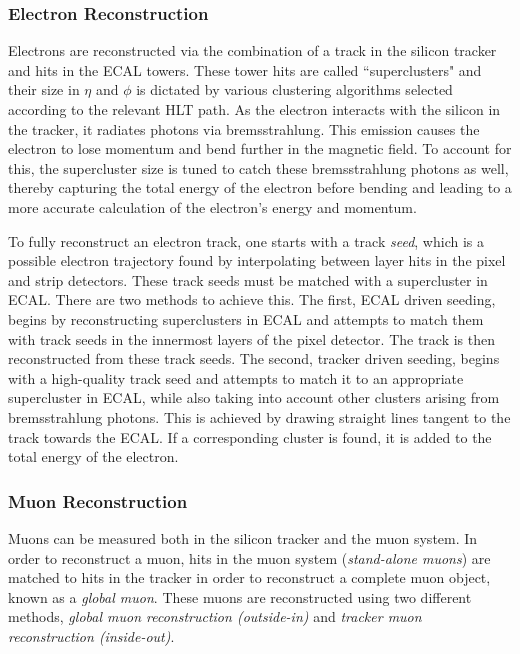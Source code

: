 \subsubsection{Electron Reconstruction}

Electrons are reconstructed via the combination of a track in the silicon tracker and hits in the ECAL towers. These tower hits are called ``superclusters" and their size in $\eta$ and $\phi$ is dictated by various clustering algorithms selected according to the relevant HLT path. As the electron interacts with the silicon in the tracker, it radiates photons via bremsstrahlung. This emission causes the electron to lose momentum and bend further in the magnetic field. To account for this, the supercluster size is tuned to catch these bremsstrahlung photons as well, thereby capturing the total energy of the electron before bending and leading to a more accurate calculation of the electron's energy and momentum. 

To fully reconstruct an electron track, one starts with a track \emph{seed}, which is a possible electron trajectory found by interpolating between layer hits in the pixel and strip detectors. These track seeds must be matched with a supercluster in ECAL. There are two methods to achieve this. The first, ECAL driven seeding, begins by reconstructing superclusters in ECAL and attempts to match them with track seeds in the innermost layers of the pixel detector. The track is then reconstructed from these track seeds. The second, tracker driven seeding, begins with a high-quality track seed and attempts to match it to an appropriate supercluster in ECAL, while also taking into account other clusters arising from bremsstrahlung photons. This is achieved by drawing straight lines tangent to the track towards the ECAL. If a corresponding cluster is found, it is added to the total energy of the electron.

\subsubsection{Muon Reconstruction}

Muons can be measured both in the silicon tracker and the muon system. In order to reconstruct a muon, hits in the muon system (\emph{stand-alone muons}) are matched to hits in the tracker in order to reconstruct a complete muon object, known as a \emph{global muon}. These muons are reconstructed using two different methods, \emph{global muon reconstruction (outside-in)} and \emph{tracker muon reconstruction (inside-out)}.

